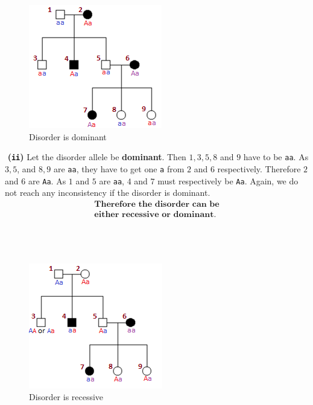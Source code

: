 \documentclass[12pt]{article}
\begin{document}
\begin{figure}
    \centering
    \includegraphics[width=.8\linewidth]{Figures/Picture1_dominant.png}
    \caption{Disorder is dominant}
\end{figure}
\par\noindent\textbf{\;\;\;\;\;\,\,(\texttt{ii})} Let the disorder allele be \textbf{dominant}. Then $1,3,5,8$ and $9$ have to be \texttt{aa}. As $3 , 5$, and $8 , 9$ are \texttt{aa}, they have to get one \texttt{a} from $2$ and $6$ respectively. Therefore $2$ and $6$ are \texttt{Aa}. As $1$ and $5$ are \texttt{aa}, $4$ and $7$ must respectively be \texttt{Aa}. Again, we do not reach any inconsistency if the disorder is dominant.
\begin{align*}
    \textbf{Therefore the disorder can be}\\
    \textbf{either recessive or dominant.}
\end{align*}\\\\\\
\begin{figure}
    \centering
    \includegraphics[width=.8\linewidth]{Figures/Picture2_recessive.png}
    \caption{Disorder is recessive}
\end{figure}
\end{document}
